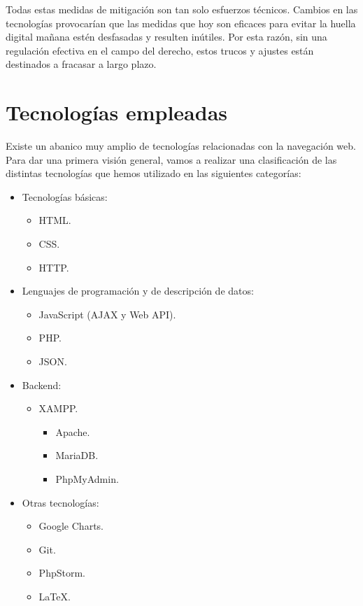 Todas estas medidas de mitigación son tan solo esfuerzos técnicos. Cambios en las tecnologías provocarían que las medidas que hoy son eficaces para evitar la huella digital mañana estén desfasadas y resulten inútiles. Por esta razón, sin una regulación efectiva en el campo del derecho, estos trucos y ajustes están destinados a fracasar a largo plazo.  \par 

\section{Tecnologías empleadas}

Existe un abanico muy amplio de tecnologías \cite{web_mozilla} relacionadas con la navegación web. Para dar una primera visión general, vamos a realizar una clasificación de las distintas tecnologías que hemos utilizado en las siguientes categorías: \par
\begin{itemize}
	\item Tecnologías básicas:
		\begin{itemize}
			\item HTML.
			\item CSS.
			\item HTTP.
		\end{itemize}
	\item Lenguajes de programación y de descripción de datos:
		\begin{itemize}
			\item JavaScript (AJAX y Web API).
			\item PHP.
			\item JSON.
		\end{itemize}
	\item Backend:
		\begin{itemize}
			\item XAMPP.
				\begin{itemize}
					\item Apache.
					\item MariaDB.
					\item PhpMyAdmin.
				\end{itemize}
		\end{itemize}
	\item Otras tecnologías:
		\begin{itemize}
			\item Google Charts.
			\item Git.
			\item PhpStorm.
			\item \LaTeX.
		\end{itemize}
\end{itemize}

